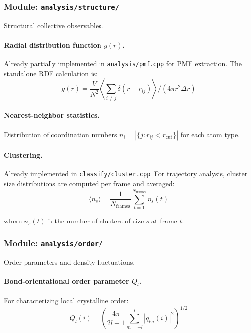 \documentclass[11pt]{article}
\newcommand{\file}[1]{\texttt{#1}}
\begin{document}
\subsubsection{Module: \texttt{analysis/structure/}}

Structural collective observables.

\paragraph{Radial distribution function $g(r)$.}
Already partially implemented in \file{analysis/pmf.cpp} for PMF
extraction.  The standalone RDF calculation is:
\begin{equation}
  g(r) = \frac{V}{N^2} \left\langle \sum_{i \neq j}
         \delta(r - r_{ij}) \right\rangle \bigg/ (4\pi r^2 \Delta r)
  \label{eq:rdf}
\end{equation}

\paragraph{Nearest-neighbor statistics.}
Distribution of coordination numbers $n_i = |\{j : r_{ij} < r_\text{cut}\}|$
for each atom type.

\paragraph{Clustering.}
Already implemented in \file{classify/cluster.cpp}.  For trajectory analysis,
cluster size distributions are computed per frame and averaged:
\begin{equation}
  \langle n_s \rangle = \frac{1}{N_\text{frames}}
  \sum_{t=1}^{N_\text{frames}} n_s(t)
  \label{eq:cluster_avg}
\end{equation}

where $n_s(t)$ is the number of clusters of size $s$ at frame $t$.

\subsubsection{Module: \texttt{analysis/order/}}

Order parameters and density fluctuations.

\paragraph{Bond-orientational order parameter $Q_l$.}
For characterizing local crystalline order:
\begin{equation}
  Q_l(i) = \left( \frac{4\pi}{2l+1}
            \sum_{m=-l}^{l} |q_{lm}(i)|^2 \right)^{1/2}
  \label{eq:ql}
\end{equation}
\end{document}

